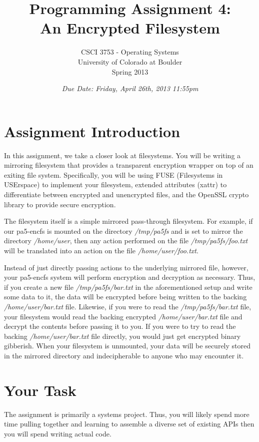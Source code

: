\documentclass[12pt]{article}
\title{Programming Assignment 4:\\An Encrypted Filesystem}
\author{
  CSCI 3753 - Operating Systems\\
  University of Colorado at Boulder\\
  Spring 2013
}
\date{\emph{Due Date: Friday, April 26th, 2013 11:55pm}}
\begin{document}
\maketitle

\section{Assignment Introduction}
In this assignment, we take a closer look at filesystems.
You will be writing a mirroring filesystem that provides a
transparent encryption wrapper on top of an exiting file system.
Specifically, you will be using FUSE\cite{fuse-website}
(Filesystems in USErspace) to implement your filesystem,
extended attributes (xattr) to differentiate between encrypted and
unencrypted files, and the OpenSSL\cite{openssl-website}
crypto\cite{openssl-evp} library to provide secure encryption.

The filesystem itself is a simple mirrored pass-through filesystem. For
example, if our pa5-encfs is mounted on the directory \textit{/tmp/pa5fs}
and is set to mirror the directory \textit{/home/user}, then any
action performed on the file \textit{/tmp/pa5fs/foo.txt}
will be translated into an action on the file
\textit{/home/user/foo.txt}.

Instead of just directly passing actions to the
underlying mirrored file, however, your pa5-encfs system will perform encryption
and decryption as necessary. Thus, if you create a new file
\textit{/tmp/pa5fs/bar.txt} in the aforementioned setup
and write some data to it, the data will
be encrypted before being written to the backing
\textit{/home/user/bar.txt} file. Likewise, if you were to read the
\textit{/tmp/pa5fs/bar.txt} file, your filesystem would read the backing encrypted
\textit{/home/user/bar.txt} file and decrypt the contents before
passing it to you. If you were to try to read
the backing \textit{/home/user/bar.txt} file directly, you would just
get encrypted binary gibberish. When your filesystem is unmounted,
your data will be securely stored in the mirrored directory
and indecipherable to anyone who may encounter it.

\section{Your Task}

The assignment is primarily a systems project. Thus, you will likely spend
more time pulling together and learning to assemble a diverse set of
existing APIs then you will spend writing actual code.
\end{document}
